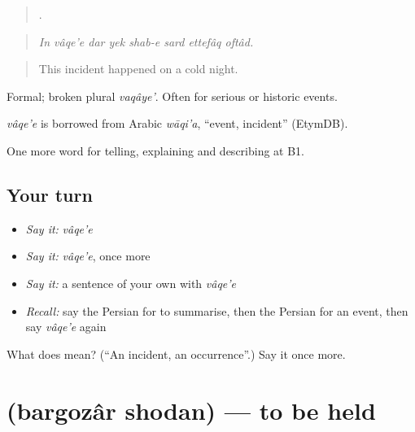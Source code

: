 \begin{quote}
       .
\end{quote}

\begin{quote}
\emph{In vâqe'e dar yek shab-e sard ettefâq oftâd.}
\end{quote}

\begin{quote}
This incident happened on a cold night.
\end{quote}

Formal; broken plural \emph{vaqâye'}. Often for serious or historic events.

\begin{cousinweb}
\emph{vâqe'e} is borrowed from Arabic \emph{wāqi'a}, \textquotedblleft{}event, incident\textquotedblright{} (EtymDB).
\end{cousinweb}

\begin{grammarlens}[title={What you've built}]
One more word for telling, explaining and describing at B1.
\end{grammarlens}

\subsection*{Your turn}
\begin{itemize}
\raggedright
  \item \emph{Say it:} \emph{vâqe'e}
  \item \emph{Say it:} \emph{vâqe'e}, once more
  \item \emph{Say it:} a sentence of your own with \emph{vâqe'e}
  \item \emph{Recall:} say the Persian for to summarise, then the Persian for an event, then say \emph{vâqe'e} again
\end{itemize}

\begin{tcolorbox}[breakable,colback=teal!4,colframe=teal!35!black,title={Before you move on}]
What does  mean? (\textquotedblleft{}An incident, an occurrence\textquotedblright{}.) Say it once more.
\end{tcolorbox}
\section[\texorpdfstring{\fa{برگزار} \fa{شدن} (bargozâr shodan)}{برگزار شدن (bargozâr shodan)}]{  (bargozâr shodan) — to be held}

